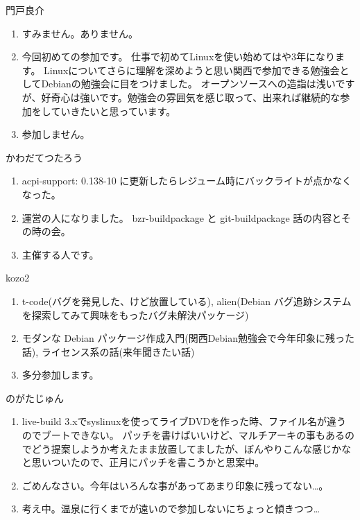 \documentclass[mingoth,a4paper]{jsarticle}
\begin{document}
\begin{prework}{ 門戸良介 }
  \begin{enumerate}
  \item すみません。ありません。
  \item
    今回初めての参加です。
    仕事で初めてLinuxを使い始めてはや3年になります。
    Linuxについてさらに理解を深めようと思い関西で参加できる勉強会としてDebianの勉強会に目をつけました。
    オープンソースへの造詣は浅いですが、好奇心は強いです。勉強会の雰囲気を感じ取って、出来れば継続的な参加をしていきたいと思っています。
  \item
    参加しません。
  \end{enumerate}
\end{prework}

\begin{prework}{ かわだてつたろう }
  \begin{enumerate}
  \item acpi-support: 0.138-10 に更新したらレジューム時にバックライトが点かなくなった。
  \item 運営の人になりました。
    bzr-buildpackage と git-buildpackage 話の内容とその時の会。
  \item 主催する人です。
  \end{enumerate}
\end{prework}

\begin{prework}{ kozo2 }
  \begin{enumerate}
  \item
    t-code(バグを発見した、けど放置している), alien(Debian バグ追跡システムを探索してみて興味をもったバグ未解決パッケージ)
  \item
    モダンな Debian パッケージ作成入門(関西Debian勉強会で今年印象に残った話), ライセンス系の話(来年聞きたい話)
  \item
    多分参加します。
  \end{enumerate}
\end{prework}

\begin{prework}{ のがたじゅん }
  \begin{enumerate}
  \item live-build 3.xでsyslinuxを使ってライブDVDを作った時、ファイル名が違うのでブートできない。
    パッチを書けばいいけど、マルチアーキの事もあるのでどう提案しようか考えたまま放置してましたが、ぼんやりこんな感じかなと思いついたので、正月にパッチを書こうかと思案中。
  \item
    ごめんなさい。今年はいろんな事があってあまり印象に残ってない…。
  \item
    考え中。温泉に行くまでが遠いので参加しないにちょっと傾きつつ…
  \end{enumerate}
\end{prework}
\end{document}
